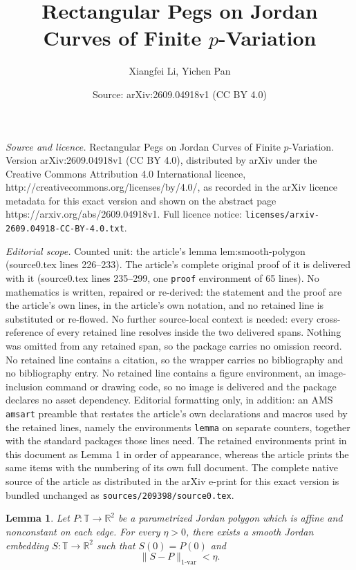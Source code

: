 \documentclass[10pt,a4paper]{amsart}
\title{Rectangular Pegs on Jordan Curves of Finite $p$-Variation}
\author{Xiangfei Li, Yichen Pan}
\date{Source: arXiv:2609.04918v1 (CC BY 4.0)}
\newtheorem{lemma}{Lemma}
\newcommand{\R}{\mathbb{R}}
\newcommand{\T}{\mathbb{T}}
\begin{document}
\maketitle

\noindent\emph{Source and licence.} Rectangular Pegs on Jordan Curves of Finite $p$-Variation. Version arXiv:2609.04918v1 (CC BY 4.0), distributed by arXiv under the Creative Commons Attribution 4.0 International licence, http://creativecommons.org/licenses/by/4.0/, as recorded in the arXiv licence metadata for this exact version and shown on the abstract page https://arxiv.org/abs/2609.04918v1. Full licence notice: \texttt{licenses/arxiv-2609.04918-CC-BY-4.0.txt}.\par\smallskip

\noindent\textit{Editorial scope.} Counted unit: the article's lemma lem:smooth-polygon (source0.tex lines 226--233). The article's complete original proof of it is delivered with it (source0.tex lines 235--299, one \texttt{proof} environment of 65 lines). No mathematics is written, repaired or re-derived: the statement and the proof are the article's own lines, in the article's own notation, and no retained line is substituted or re-flowed.  No further source-local context is needed: every cross-reference of every retained line resolves inside the two delivered spans.  Nothing was omitted from any retained span, so the package carries no omission record.  No retained line contains a citation, so the wrapper carries no bibliography and no bibliography entry.  No retained line contains a figure environment, an image-inclusion command or drawing code, so no image is delivered and the package declares no asset dependency.  Editorial formatting only, in addition: an AMS \texttt{amsart} preamble that restates the article's own declarations and macros used by the retained lines, namely the environments \texttt{lemma} on separate counters, together with the standard packages those lines need.  The retained environments print in this document as Lemma 1 in order of appearance, whereas the article prints the same items with the numbering of its own full document.  The complete native source of the article as distributed in the arXiv e-print for this exact version is bundled unchanged as \texttt{sources/209398/source0.tex}.
\begin{lemma}\label{lem:smooth-polygon}
Let \(P\colon\T\to\R^2\) be a parametrized Jordan polygon which is affine and
nonconstant on each edge.  For every \(\eta>0\), there exists a smooth Jordan
embedding \(S\colon\T\to\R^2\) such that \(S(0)=P(0)\) and
\begin{equation}\label{eq:w11-smooth}
 \lVert S-P\rVert_{1\text{-var}}<\eta.
\end{equation}
\end{lemma}
\end{document}
